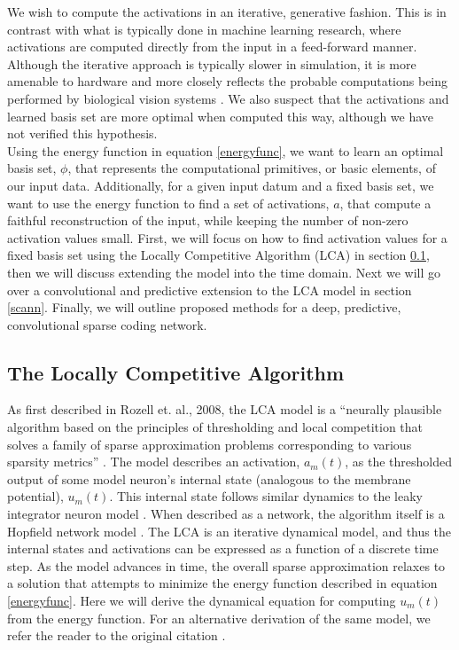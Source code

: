 \documentclass[smallextended]{svjour3}       %
\begin{document}
\noindent We wish to compute the activations in an iterative, generative fashion. This is in contrast with what is typically done in machine learning research, where activations are computed directly from the input in a feed-forward manner. Although the iterative approach is typically slower in simulation, it is more amenable to hardware and more closely reflects the probable computations being performed by biological vision systems \cite{olshausen1996emergence}. We also suspect that the activations and learned basis set are more optimal when computed this way, although we have not verified this hypothesis.\\

\noindent Using the energy function in equation \ref{energyfunc}, we want to learn an optimal basis set, $\phi$, that represents the computational primitives, or basic elements, of our input data. Additionally, for a given input datum and a fixed basis set, we want to use the energy function to find a set of activations, $a$, that compute a faithful reconstruction of the input, while keeping the number of non-zero activation values small. First, we will focus on how to find activation values for a fixed basis set using the Locally Competitive Algorithm (LCA) \cite{rozell2008sparse} in section \ref{lca}, then we will discuss extending the model into the time domain. Next we will go over a convolutional and predictive extension to the LCA model in section \ref{scann}. Finally, we will outline proposed methods for a deep, predictive, convolutional sparse coding network.

\subsection{The Locally Competitive Algorithm} \label{lca}
\noindent As first described in Rozell et. al., 2008, the LCA model is a ``neurally plausible algorithm based on the principles of thresholding and local competition that solves a family of sparse approximation problems corresponding to various sparsity metrics'' \cite{rozell2008sparse}. The model describes an activation, $a_{m}(t)$, as the thresholded output of some model neuron's internal state (analogous to the membrane potential), $u_{m}(t)$. This internal state follows similar dynamics to the leaky integrator neuron model \cite{dayan2001theoretical}. When described as a network, the algorithm itself is a Hopfield network model \cite{hopfield1982neural}. The LCA is an iterative dynamical model, and thus the internal states and activations can be expressed as a function of a discrete time step. As the model advances in time, the overall sparse approximation relaxes to a solution that attempts to minimize the energy function described in equation \ref{energyfunc}. Here we will derive the dynamical equation for computing $u_{m}(t)$ from the energy function. For an alternative derivation of the same model, we refer the reader to the original citation \cite{rozell2008sparse}.\\
\end{document}
